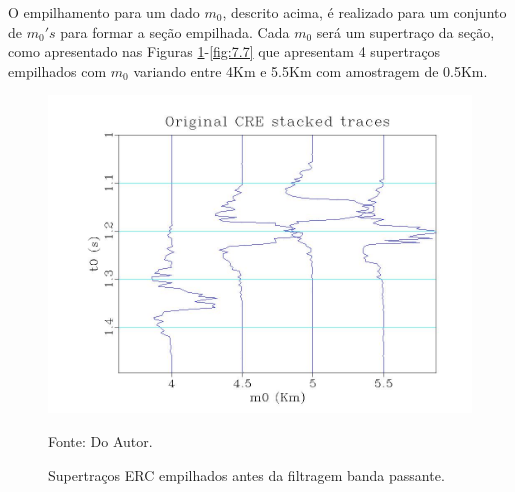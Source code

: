 
O empilhamento para um dado $m_0$, descrito acima, é realizado para um conjunto de $m_0's$ para formar a seção empilhada.
Cada $m_0$ será um supertraço da seção, como apresentado nas Figuras \ref{fig:7.6}-\ref{fig:7.7} 
que apresentam 4 supertraços empilhados
com $m_0$ variando entre 4Km e 5.5Km com amostragem de 0.5Km.

\begin{figure}
\caption{Supertraços ERC empilhados antes da filtragem banda passante.}
\begin{center}
\includegraphics[scale=0.4]{images/stackedTraces.jpeg}
\vspace{-0.3cm}
\end{center}
\begin{center}
 Fonte: Do Autor.
\end{center}
\label{fig:7.6}
\end{figure}

